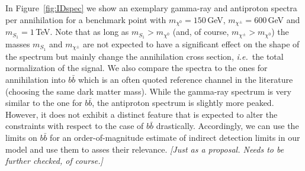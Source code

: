 \documentclass[11pt]{cernrep}
\newcommand{\com}[1]{\emph{\color{red}[#1]}}  	%
\begin{document}
In Figure~\ref{fig:IDspec} we show an exemplary gamma-ray and antiproton spectra per annihilation for a benchmark point
with $m_{\chi^0}=150\,$GeV, $m_{\chi^\pm}=600\,$GeV and $m_{S_1}=1\,$TeV. Note that as long as 
$m_{S_1}> m_{\chi^0}$ (and, of course, $m_{\chi^\pm}> m_{\chi^0}$) the masses $m_{S_1}$ and $m_{\chi^\pm}$ 
are not expected to have a significant effect on the shape of the spectrum but mainly change the annihilation cross section,
\emph{i.e.}~the total normalization of the signal.
We also compare the spectra to the ones for annihilation into $b\bar b$ which is an often
quoted reference channel in the literature (choosing the same dark matter mass). 
While the gamma-ray spectrum is very similar to the one for $b\bar b$,
the antiproton spectrum is slightly more peaked. However, it does not exhibit a distinct feature that is expected to 
alter the constraints with respect to the case of $b\bar b$ drastically. Accordingly, we can use the limits on $b\bar b$
for an order-of-magnitude estimate of indirect detection limits in our model and use them to asses their relevance.
\com{Just as a proposal. Needs to be further checked, of course.}
\end{document}
